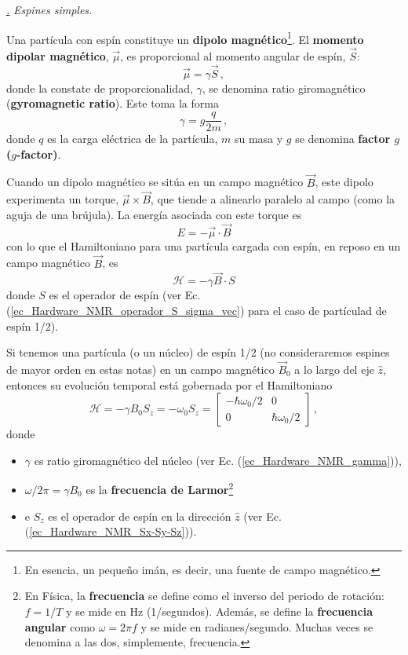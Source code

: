 \documentclass[a4paper,11pt]{book} %
\numberwithin{equation}{chapter}
\def\subsubiContadorIt{\par\addtocounter{subsubsection}{1}\underline{\it\thesubsubsection.}\hskip0.5cm \setcounter{subsubsubsectionIt}{0}}
\newcommand{\SubsubiIt}[1]{
		\subsubiContadorIt \textit{#1}
	}
\newcounter{subsubsubsectionIt}[subsubsection]
\begin{document}
			\SubsubiIt{Espines simples.} 

Una partícula con espín constituye un \textbf{dipolo magnético}\footnote{En esencia, un pequeño imán, es decir, una fuente de campo magnético.}. El \textbf{momento dipolar magnético}, $\vec{\mu}$, es proporcional al momento angular de espín, $\vec{S}$:
	\begin{equation} \label{ec_Hardware_NMR_mu}
	\vec{\mu} = \gamma \vec{S}\, ,
	\end{equation}
donde la constate de proporcionalidad, $\gamma$, se denomina ratio giromagnético (\textbf{gyromagnetic ratio}). Este toma la forma
	\begin{equation} \label{ec_Hardware_NMR_gamma}
	\gamma = g \frac{q}{2m} \, ,
	\end{equation}
donde $q$ es la carga eléctrica de la partícula, $m$ su masa y $g$ se denomina \textbf{factor $g$ ($g$-factor)}. 

Cuando un dipolo magnético se sitúa en un campo magnético $\vec{B}$, este dipolo experimenta un torque, $\vec{\mu} \times \vec{B}$, que tiende a alinearlo paralelo al campo (como la aguja de una brújula). La energía asociada con este torque es
	\begin{equation}
		E = - \vec{\mu} \cdot \vec{B}
		\end{equation}	
con lo que el Hamiltoniano para una partícula cargada con espín, en reposo en un campo magnético $\vec{B}$, es
	\begin{equation}
	\mathcal{H} = - \gamma \vec{B} \cdot S
	\end{equation}
donde $S$ es el operador de espín (ver Ec. (\ref{ec_Hardware_NMR_operador_S_sigma_vec}) para el caso de partículad de espín 1/2).

Si tenemos una partícula (o un núcleo) de espín 1/2 (no consideraremos espines de mayor orden en estas notas) en un campo magnético $\vec{B}_0$ a lo largo del eje $\hat{z}$, entonces su evolución temporal está gobernada por el Hamiltoniano
	\begin{equation} \label{ec_Hardware_NMR_H_sys_1}
	\boxed{\mathcal{H} = -  \gamma B_0 S_z = - \omega_0 S_z = 
	\begin{bmatrix}
	- \hbar \omega_0/2  & 0 \\
	0  &  \hbar \omega_0 /2
	\end{bmatrix}} \, ,
	\end{equation}
donde 
\begin{itemize}
	\item $\gamma$ es ratio giromagnético del núcleo (ver Ec. (\ref{ec_Hardware_NMR_gamma})),
	\item $\omega/2 \pi = \gamma B_0 $ es la \textbf{frecuencia de Larmor}\footnote{En Física, la \textbf{frecuencia} se define como el inverso del periodo de rotación: $f = 1/T$ y se mide en Hz (1/segundos). Además, se define la \textbf{frecuencia angular} como $\omega = 2\pi f$ y se mide en radianes/segundo. Muchas veces se denomina a las dos, simplemente, frecuencia.}
	\item e $S_z$ es el operador de espín en la dirección $\hat{z}$ (ver Ec. (\ref{ec_Hardware_NMR_Sx-Sy-Sz})).
\end{itemize}
\end{document}

